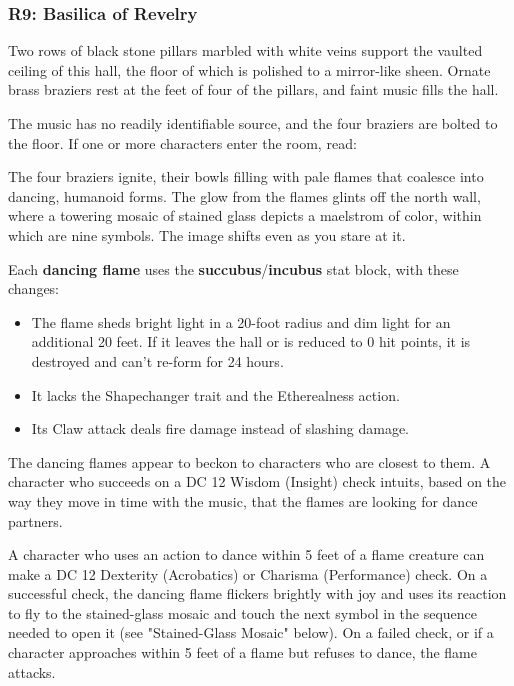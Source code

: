 \documentclass[10pt,a4paper,twoside,bg=print,twocolumn,openany,nodeprecatedcode]{dndbook}
\begin{document}
\subsubsection{R9: Basilica of Revelry}
\begin{DndReadAloud}{}
Two rows of black stone pillars marbled with white veins support the vaulted ceiling of this hall, the floor of which is polished to a mirror-like sheen. Ornate brass braziers rest at the feet of four of the pillars, and faint music fills the hall.

\end{DndReadAloud}

The music has no readily identifiable source, and the four braziers are bolted to the floor. If one or more characters enter the room, read:

\begin{DndReadAloud}{}
The four braziers ignite, their bowls filling with pale flames that coalesce into dancing, humanoid forms. The glow from the flames glints off the north wall, where a towering mosaic of stained glass depicts a maelstrom of color, within which are nine symbols. The image shifts even as you stare at it.

\end{DndReadAloud}

Each \textbf{dancing flame} uses the \textbf{succubus}/\textbf{incubus} stat block, with these changes:


\begin{itemize}
\item The flame sheds bright light in a 20-foot radius and dim light for an additional 20 feet. If it leaves the hall or is reduced to 0 hit points, it is destroyed and can't re-form for 24 hours.
\item It lacks the Shapechanger trait and the Etherealness action.
\item Its Claw attack deals fire damage instead of slashing damage.
\end{itemize}

The dancing flames appear to beckon to characters who are closest to them. A character who succeeds on a DC 12 Wisdom (Insight) check intuits, based on the way they move in time with the music, that the flames are looking for dance partners.

A character who uses an action to dance within 5 feet of a flame creature can make a DC 12 Dexterity (Acrobatics) or Charisma (Performance) check. On a successful check, the dancing flame flickers brightly with joy and uses its reaction to fly to the stained-glass mosaic and touch the next symbol in the sequence needed to open it (see "Stained-Glass Mosaic" below). On a failed check, or if a character approaches within 5 feet of a flame but refuses to dance, the flame attacks.
\end{document}

